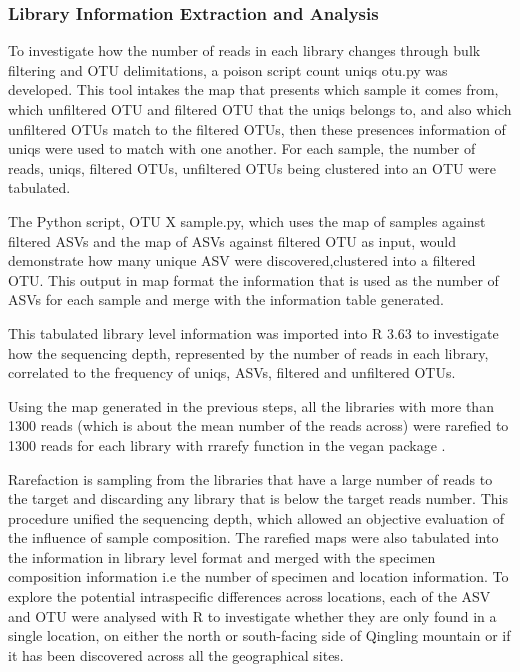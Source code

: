 \documentclass[11pt, a4paper]{article}
\begin{document}
\subsubsection{Library Information Extraction and Analysis}

To investigate how the number of reads in each library changes through bulk filtering and OTU delimitations, a poison script count uniqs otu.py  was developed. This tool intakes the map that presents which sample it comes from, which unfiltered OTU and filtered OTU that the uniqs belongs to, and also which unfiltered OTUs match to the filtered OTUs, then these presences information of uniqs were used to match with one another. For each sample, the number of reads, uniqs, filtered OTUs, unfiltered OTUs being clustered into an OTU were tabulated. 

The Python script, OTU X sample.py, which uses the map of samples against filtered ASVs and the map of ASVs against filtered OTU as input, would demonstrate how many unique ASV were discovered,clustered into a filtered OTU. This output in map format the information that is  used as the number of ASVs for each sample and merge with the information table generated. 

This tabulated library level information was imported into R 3.63\cite{R} to investigate how the sequencing depth, represented by the number of reads in each library, correlated to the frequency of uniqs, ASVs, filtered and unfiltered OTUs. 

Using the map generated in the previous steps, all the libraries with more than 1300 reads (which is about the mean number of the reads across) were rarefied to 1300 reads for each library with rrarefy function in the vegan package\cite{vegan} . 

Rarefaction is sampling from the libraries that have a large number of reads to the target and discarding any library that is below the target reads number. This procedure unified the sequencing depth, which allowed an objective evaluation of the influence of sample composition. The rarefied maps were also tabulated into the information in library level format and merged with the specimen composition information i.e the number of specimen and location information.
To explore the potential intraspecific differences across locations, each of the ASV and OTU were analysed with R to investigate whether they are only found in a single location, on either the north or south-facing side of Qingling mountain or if it has been discovered across all the geographical sites.
\end{document}
